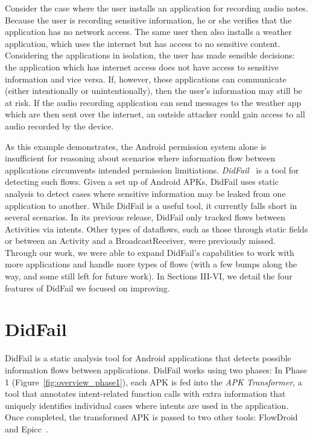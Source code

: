 Consider the case where the user installs an application for recording audio notes. Because the user is recording sensitive information, he or she verifies that the application has no network access. The same user then also installs a weather application, which uses the internet but has access to no sensitive content. Considering the applications in isolation, the user has made sensible decisions: the application which has internet access does not have access to sensitive information and vice versa. If, however, these applications can communicate (either intentionally or unintentionally), then the user's information may still be at risk. If the audio recording application can send messages to the weather app which are then sent over the internet, an outside attacker could gain access to all audio recorded by the device.

As this example demonstrates, the Android permission system alone is insufficient for reasoning about scenarios where information flow between applications circumvents intended permission limitiations. \emph{DidFail}~\cite{didfail} is a tool for detecting such flows. Given a set up of Android APKs, DidFail uses static analysis to detect cases where sensitive information may be leaked from one application to another. While DidFail is a useful tool, it currently falls short in several scenarios. In its previous release, DidFail only tracked flows between Activities via intents. Other types of dataflows, such as those through static fields or between an Activity and a BroadcastReceiver, were previously missed. Through our work, we were able to expand DidFail's capabilities to work with more applications and handle more types of flows (with a few bumps along the way, and some still left for future work). In Sections III-VI, we detail the four features of DidFail we focused on improving.

\section{DidFail}

DidFail is a static analysis tool for Android applications that detects possible information flows between applications. DidFail works using two phases: In Phase 1 (Figure~\ref{fig:overview_phase1}), each APK is fed into the \emph{APK Transformer}, a tool that annotates intent-related function calls with extra information that uniquely identifies individual cases where intents are used in the application. Once completed, the transformed APK is passed to two other tools: FlowDroid~\cite{flowdroid} and Epicc~\cite{epicc}.

